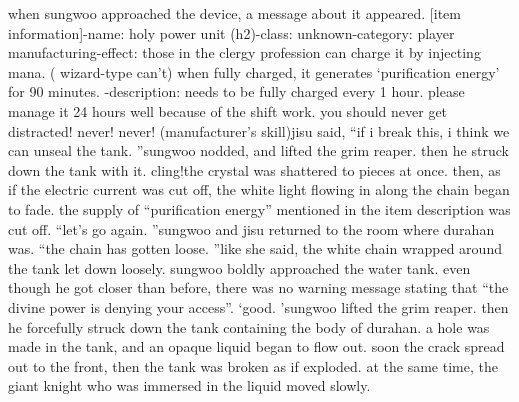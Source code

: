when sungwoo approached the device, a message about it appeared.
[item information]-name: holy power unit (h2)-class: unknown-category: player manufacturing-effect: those in the clergy profession can charge it by injecting mana.
 ( wizard-type can’t) when fully charged, it generates ‘purification energy’ for 90 minutes.
-description: needs to be fully charged every 1 hour.
 please manage it 24 hours well because of the shift work.
 you should never get distracted! never! never! (manufacturer’s skill)jisu said, “if i break this, i think we can unseal the tank.
”sungwoo nodded, and lifted the grim reaper.
 then he struck down the tank with it.
cling!the crystal was shattered to pieces at once.
then, as if the electric current was cut off, the white light flowing in along the chain began to fade.
 the supply of “purification energy” mentioned in the item description was cut off.
“let’s go again.
”sungwoo and jisu returned to the room where durahan was.
“the chain has gotten loose.
”like she said, the white chain wrapped around the tank let down loosely.
sungwoo boldly approached the water tank.
 even though he got closer than before, there was no warning message stating that “the divine power is denying your access”.
‘good.
’sungwoo lifted the grim reaper.
 then he forcefully struck down the tank containing the body of durahan.
 a hole was made in the tank, and an opaque liquid began to flow out.
soon the crack spread out to the front, then the tank was broken as if exploded.
at the same time, the giant knight who was immersed in the liquid moved slowly.

